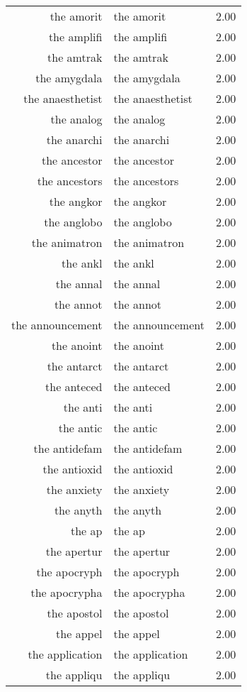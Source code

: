 \begin{table}[ht]
\begin{tabular}{rlr}
  the amorit & the amorit & 2.00 \\ 
  the amplifi & the amplifi & 2.00 \\ 
  the amtrak & the amtrak & 2.00 \\ 
  the amygdala & the amygdala & 2.00 \\ 
  the anaesthetist & the anaesthetist & 2.00 \\ 
  the analog & the analog & 2.00 \\ 
  the anarchi & the anarchi & 2.00 \\ 
  the ancestor & the ancestor & 2.00 \\ 
  the ancestors & the ancestors & 2.00 \\ 
  the angkor & the angkor & 2.00 \\ 
  the anglobo & the anglobo & 2.00 \\ 
  the animatron & the animatron & 2.00 \\ 
  the ankl & the ankl & 2.00 \\ 
  the annal & the annal & 2.00 \\ 
  the annot & the annot & 2.00 \\ 
  the announcement & the announcement & 2.00 \\ 
  the anoint & the anoint & 2.00 \\ 
  the antarct & the antarct & 2.00 \\ 
  the anteced & the anteced & 2.00 \\ 
  the anti & the anti & 2.00 \\ 
  the antic & the antic & 2.00 \\ 
  the antidefam & the antidefam & 2.00 \\ 
  the antioxid & the antioxid & 2.00 \\ 
  the anxiety & the anxiety & 2.00 \\ 
  the anyth & the anyth & 2.00 \\ 
  the ap & the ap & 2.00 \\ 
  the apertur & the apertur & 2.00 \\ 
  the apocryph & the apocryph & 2.00 \\ 
  the apocrypha & the apocrypha & 2.00 \\ 
  the apostol & the apostol & 2.00 \\ 
  the appel & the appel & 2.00 \\ 
  the application & the application & 2.00 \\ 
  the appliqu & the appliqu & 2.00 \\ 

\end{tabular}
\end{table}
